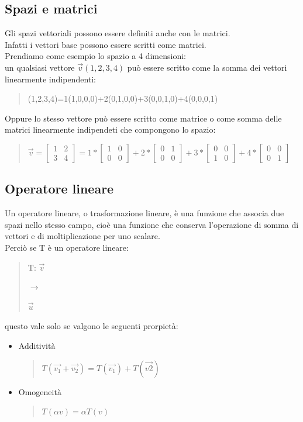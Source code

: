 \documentclass[a4paper]{article}
\begin{document}
\subsection{Spazi e matrici}
Gli spazi vettoriali possono essere definiti anche con le matrici.
\\ Infatti i vettori base possono essere scritti come matrici.
\\ Prendiamo come esempio lo spazio a 4 dimensioni:
\\ un qualsiasi vettore $\vec{v}(1,2,3,4)$ può essere scritto come la somma dei vettori linearmente indipendenti:
\begin{quote} \centering (1,2,3,4)=1(1,0,0,0)+2(0,1,0,0)+3(0,0,1,0)+4(0,0,0,1)
\end{quote}
Oppure lo stesso vettore può essere scritto come matrice o come somma delle matrici linearmente indipendeti che compongono lo spazio:
\\
\begin{quote} \centering $\vec{v}
=\left[\begin{matrix}1& 2\\ 3 & 4\end{matrix}\right]
= 1*\left[\begin{matrix}1& 0 \\ 0 & 0\end{matrix}\right]
+ 2*\left[\begin{matrix}0 & 1 \\ 0 & 0\end{matrix}\right]
+ 3*\left[\begin{matrix}0 & 0 \\ 1 & 0\end{matrix}\right]
+ 4*\left[\begin{matrix}0 & 0 \\ 0 & 1\end{matrix}\right]
$\end{quote}
 	
\subsection{Operatore lineare}
Un operatore lineare, o trasformazione lineare, è una funzione che associa due spazi nello stesso campo, cioè una funzione che conserva l'operazione di somma di vettori e di moltiplicazione per uno scalare.
\\ Perciò se T è un operatore lineare:
\begin{quote} \centering T: $\vec{v} 
$
\begin{large} $\rightarrow$ \end{large} 
$ \vec{u}
$\end{quote}
questo vale solo se valgono le seguenti prorpietà:
\begin{itemize}
\item Additività
\begin{quote} \centering $T(\vec{v_{1}} + \vec{v_{2}})= T(\vec{v_{1}})+T(\vec{v{2}}) 
$\end{quote}
\item Omogeneità
\begin{quote} \centering $T(\alpha v)=\alpha T(v) $
\end{quote}
\end{itemize}
\end{document}
